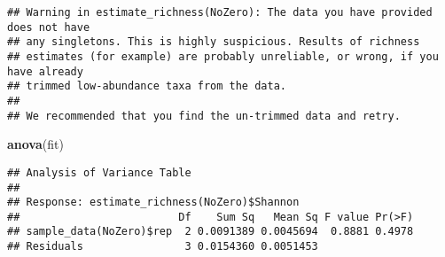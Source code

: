 \documentclass[]{article}
\newenvironment{Shaded}{\begin{snugshade}}{\end{snugshade}}
\newcommand{\KeywordTok}[1]{\textcolor[rgb]{0.13,0.29,0.53}{\textbf{#1}}}
\newcommand{\StringTok}[1]{\textcolor[rgb]{0.31,0.60,0.02}{#1}}
\newcommand{\CommentTok}[1]{\textcolor[rgb]{0.56,0.35,0.01}{\textit{#1}}}
\newcommand{\OperatorTok}[1]{\textcolor[rgb]{0.81,0.36,0.00}{\textbf{#1}}}
\newcommand{\NormalTok}[1]{#1}
\begin{document}
\begin{Shaded}
\end{Shaded}

\begin{verbatim}
## Warning in estimate_richness(NoZero): The data you have provided does not have
## any singletons. This is highly suspicious. Results of richness
## estimates (for example) are probably unreliable, or wrong, if you have already
## trimmed low-abundance taxa from the data.
## 
## We recommended that you find the un-trimmed data and retry.
\end{verbatim}

\begin{Shaded}
\begin{Highlighting}[]
\KeywordTok{anova}\NormalTok{(fit)}
\end{Highlighting}
\end{Shaded}

\begin{verbatim}
## Analysis of Variance Table
## 
## Response: estimate_richness(NoZero)$Shannon
##                         Df    Sum Sq   Mean Sq F value Pr(>F)
## sample_data(NoZero)$rep  2 0.0091389 0.0045694  0.8881 0.4978
## Residuals                3 0.0154360 0.0051453
\end{verbatim}
\end{document}
